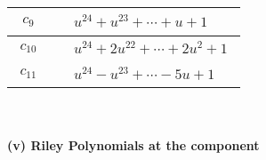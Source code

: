 \documentclass[1p]{elsarticle_modified}
\theoremstyle{definition}
\begin{document}
\begin{tabular}{m{50pt}|m{274pt}}
\hline $$\begin{aligned}c_{9}\end{aligned}$$&$\begin{aligned}
&u^{24}+u^{23}+\cdots+u+1
\end{aligned}$\\
\hline $$\begin{aligned}c_{10}\end{aligned}$$&$\begin{aligned}
&u^{24}+2 u^{22}+\cdots+2 u^2+1
\end{aligned}$\\
\hline $$\begin{aligned}c_{11}\end{aligned}$$&$\begin{aligned}
&u^{24}- u^{23}+\cdots-5 u+1
\end{aligned}$\\
\hline
\end{tabular}\\~\\
\newpage\renewcommand{\arraystretch}{1}
\flushleft \textbf{(v) Riley Polynomials at the component}\newline \\
\end{document}
